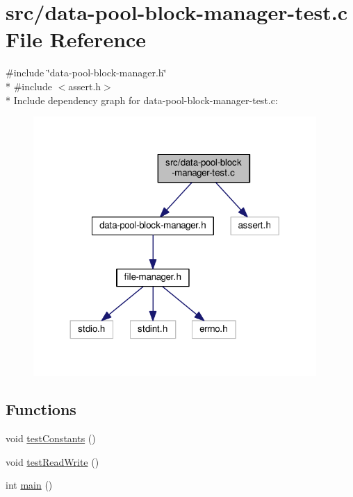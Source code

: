 \hypertarget{data-pool-block-manager-test_8c}{\section{src/data-\/pool-\/block-\/manager-\/test.c File Reference}
\label{data-pool-block-manager-test_8c}
}
{\ttfamily \#include \char`\"{}data-\/pool-\/block-\/manager.\-h\char`\"{}}\\*
{\ttfamily \#include $<$assert.\-h$>$}\\*
Include dependency graph for data-\/pool-\/block-\/manager-\/test.c\-:
\nopagebreak
\begin{figure}[H]
\begin{center}
\leavevmode
\includegraphics[width=305pt]{data-pool-block-manager-test_8c__incl}
\end{center}
\end{figure}
\subsection*{Functions}
\begin{DoxyCompactItemize}
\item 
void \hyperlink{data-pool-block-manager-test_8c_ae85954364eb34c20aec506171ba5f351}{test\-Constants} ()
\item 
void \hyperlink{data-pool-block-manager-test_8c_a75323f97b259a6284370855087fb48ff}{test\-Read\-Write} ()
\item 
int \hyperlink{data-pool-block-manager-test_8c_ae66f6b31b5ad750f1fe042a706a4e3d4}{main} ()
\end{DoxyCompactItemize}


